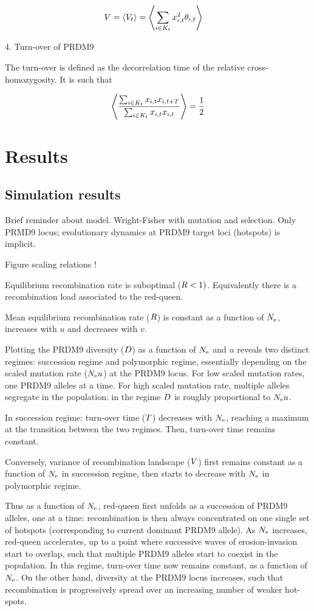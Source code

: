 \documentclass{article}
\begin{document}
\begin{align}
     V &= \left< V_{t} \right> = \left< \sum_{i \in K_{t}} x_{i,t}^2 \theta _{i,t} \right> 
\end{align}

4. Turn-over of PRDM9

The turn-over is defined as the decorrelation time of the relative cross-homozygosity.
It is such that 

\begin{align}
    \left< \dfrac{\sum_{i \in K_{t}} x_{i,t} x_{i,t+T}}{\sum_{i \in K_{t}} x_{i,t} x_{i,t}}   \right>  =  \dfrac{1}{2}
\end{align}

\section*{Results}
\subsection*{Simulation results} 

Brief reminder about model. Wright-Fisher with mutation and selection. Only PRMD9 locus; evolutionary dynamics at PRDM9 target loci (hotspots) is implicit.

Figure scaling relations !

Equilibrium recombination rate is suboptimal ($R < 1)$. Equivalently there is a recombination load associated to the red-queen.

Mean equilibrium recombination rate ($R$) is constant as a function of $N_\mathrm{e}$, increases with $u$ and decreases with $v$.

Plotting the PRDM9 diversity ($D$) as a function of $N_\mathrm{e}$ and $u$ reveals two distinct regimes: succession regime and polymorphic regime, essentially depending on the scaled mutation rate ($N_\mathrm{e} u$) at the PRDM9 locus. For low scaled mutation rates, one PRDM9 alleles at a time. For high scaled mutation rate, multiple alleles segregate in the population: in the regime $D$ is roughly proportional to $N_\mathrm{e} u$.

In succession regime: turn-over time ($T$) decreases with $N_\mathrm{e}$, reaching a maximum at the transition between the two regimes. Then, turn-over time remains constant.

Conversely, variance of recombination landscape ($V$) first remains constant as a function of $N_\mathrm{e}$ in succession regime, then starts to decrease with $N_\mathrm{e}$ in polymorphic regime.

Thus as a function of $N_\mathrm{e}$, red-queen first unfolds as a succession of PRDM9 alleles, one at a time: recombination is then always concentrated on one single set of hotspots (corresponding to current dominant PRDM9 allele). As $N_\mathrm{e}$ increases, red-queen accelerates, up to a point where successive waves of erosion-invasion start to overlap, such that multiple PRDM9 alleles start to coexist in the population. In this regime, turn-over time now remains constant, as a function of $N_\mathrm{e}$. On the other hand, diversity at the PRDM9 locus increases, such that recombination is progressively spread over an increasing number of weaker hot-spots.
\end{document}
